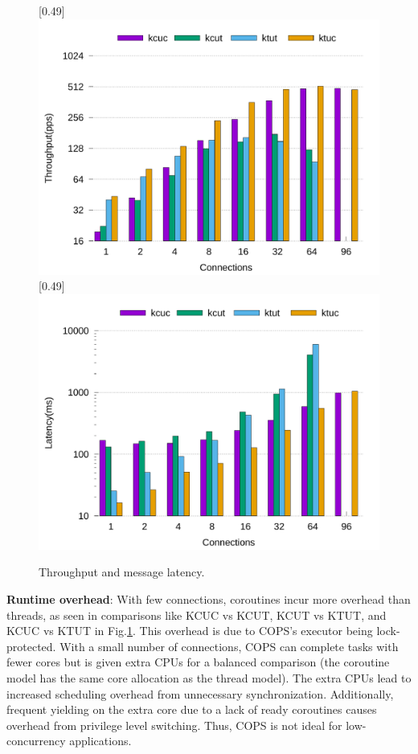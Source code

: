 \documentclass[conference]{IEEEtran}
\begin{document}
\begin{figure}[tbp]
	\centering
	[0.49\linewidth]
	{
		\includegraphics[width=\linewidth]{assets/throughput.pdf}
	}
	[0.49\linewidth]
	{
		\includegraphics[width=\linewidth]{assets/latency.pdf}
	}
	\caption{Throughput and message latency.}
	\label{fig:throughput-latency}
  \vspace{-1em}
\end{figure}

\textbf{Runtime overhead}: With few connections, coroutines incur more overhead than threads, as seen in comparisons like KCUC vs KCUT, KCUT vs KTUT, and KCUC vs KTUT in Fig.\ref{fig:throughput-latency}. This overhead is due to COPS's executor being lock-protected. With a small number of connections, COPS can complete tasks with fewer cores but is given extra CPUs for a balanced comparison (the coroutine model has the same core allocation as the thread model). The extra CPUs lead to increased scheduling overhead from unnecessary synchronization. Additionally, frequent yielding on the extra core due to a lack of ready coroutines causes overhead from privilege level switching. Thus, COPS is not ideal for low-concurrency applications.
\end{document}
